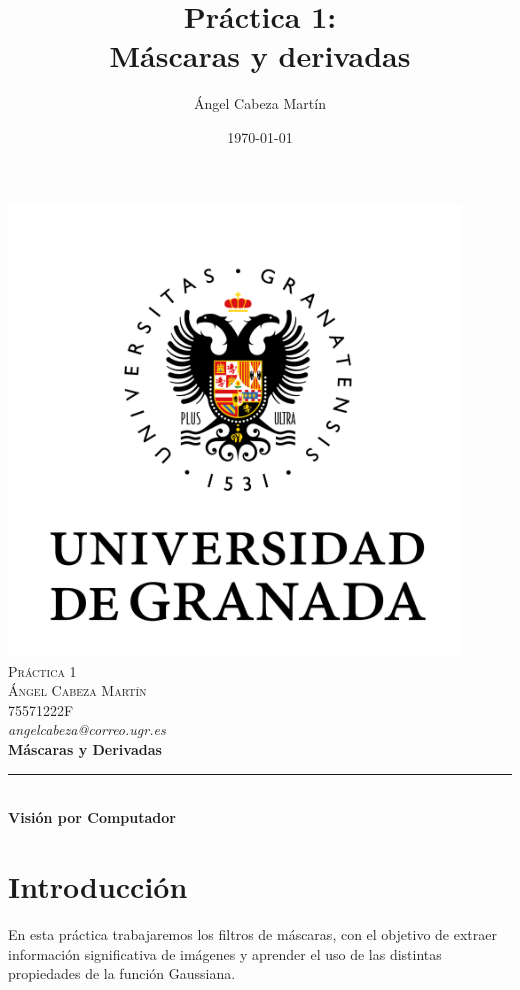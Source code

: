 \documentclass[12pt,spanish]{article}
\title{Práctica 1:\\
Máscaras y derivadas  \hspace{0.05cm} }
\author{Ángel Cabeza Martín}
\date{\today}
\begin{document}
\begin{titlepage}
 
 
\newlength{\centeroffset}
\setlength{\centeroffset}{-0.5\oddsidemargin}
\addtolength{\centeroffset}{0.5\evensidemargin}
\thispagestyle{empty}

\noindent\hspace*{\centeroffset}

\centering
\includegraphics[width=0.9\textwidth]{./imagenes_memoria/ugr.png}\\[0.5cm]

\textsc{ \Large Práctica 1\\[0.2cm]}
\textsc{ \Large Ángel Cabeza Martín}\\
\textsc{ \Large 75571222F}\\
\textsl{ angelcabeza@correo.ugr.es}\\[0.5cm]
% 
{\Huge\bfseries Máscaras y Derivadas\\
}
\noindent\rule[-1ex]{\textwidth}{2pt}\\[3.5ex]
{\large\bfseries Visión por Computador}
\end{titlepage}


\tableofcontents
\pagebreak

\section*{Introducción}
En esta práctica trabajaremos los filtros de máscaras, con el objetivo de extraer información significativa de imágenes y aprender el uso de las distintas propiedades de la función Gaussiana.\newline 
\end{document}
